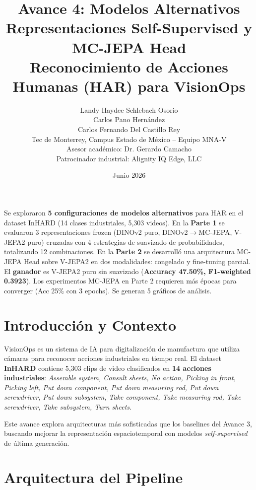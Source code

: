 \documentclass[11pt,letterpaper]{article}
\title{\textbf{Avance 4: Modelos Alternativos} \\[0.3em]
\large Representaciones Self-Supervised y MC-JEPA Head \\[0.2em]
\normalsize Reconocimiento de Acciones Humanas (HAR) para VisionOps}
\author{
  Landy Haydee Schlebach Osorio \\
  Carlos Pano Hernández \\
  Carlos Fernando Del Castillo Rey \\[0.5em]
  \small Tec de Monterrey, Campus Estado de México -- Equipo MNA-V \\
  \small Asesor académico: Dr. Gerardo Camacho \\
  \small Patrocinador industrial: Alignity IQ Edge, LLC
}
\date{Junio 2026}
\begin{document}
\maketitle

\begin{tcolorbox}[colback=boxBlue, colframe=vjepaBlue, title=\textbf{Resumen Ejecutivo}, fonttitle=\bfseries]
Se exploraron \textbf{5 configuraciones de modelos alternativos} para HAR en el dataset InHARD (14 clases industriales, 5,303 videos). En la \textbf{Parte 1} se evaluaron 3 representaciones frozen (DINOv2 puro, DINOv2$\to$MC-JEPA, V-JEPA2 puro) cruzadas con 4 estrategias de suavizado de probabilidades, totalizando 12 combinaciones. En la \textbf{Parte 2} se desarrolló una arquitectura MC-JEPA Head sobre V-JEPA2 en dos modalidades: congelado y fine-tuning parcial. El \textbf{ganador} es V-JEPA2 puro sin suavizado (\textbf{Accuracy 47.50\%, F1-weighted 0.3923}). Los experimentos MC-JEPA en Parte 2 requieren más épocas para converger (Acc 25\% con 3 epochs). Se generan 5 gráficos de análisis.
\end{tcolorbox}

\vspace{0.5em}

\section{Introducción y Contexto}

VisionOps es un sistema de IA para digitalización de manufactura que utiliza cámaras para reconocer acciones industriales en tiempo real. El dataset \textbf{InHARD} contiene 5,303 clips de video clasificados en \textbf{14 acciones industriales}: \textit{Assemble system, Consult sheets, No action, Picking in front, Picking left, Put down component, Put down measuring rod, Put down screwdriver, Put down subsystem, Take component, Take measuring rod, Take screwdriver, Take subsystem, Turn sheets}.

Este avance explora arquitecturas más sofisticadas que los baselines del Avance 3, buscando mejorar la representación espaciotemporal con modelos \textit{self-supervised} de última generación.

\section{Arquitectura del Pipeline}
\end{document}
